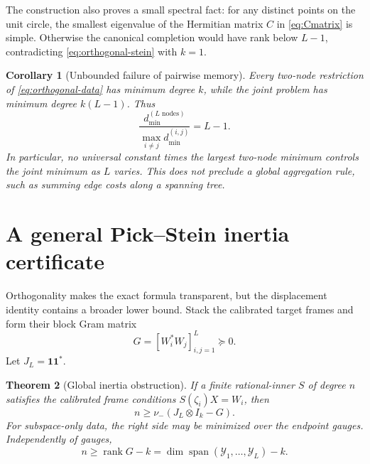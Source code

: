 \documentclass[11pt]{article}
\newtheorem{theorem}{Theorem}[section]
\newtheorem{corollary}[theorem]{Corollary}
\theoremstyle{definition}
\theoremstyle{remark}
\newcommand{\rank}{\operatorname{rank}}
\newcommand{\Span}{\operatorname{span}}
\newcommand{\nminus}{\nu_{-}}
\begin{document}
The construction also proves a small spectral fact: for any distinct points
on the unit circle, the smallest eigenvalue of the Hermitian matrix $C$ in
\eqref{eq:Cmatrix} is simple.  Otherwise the canonical completion would have
rank below $L-1$, contradicting \eqref{eq:orthogonal-stein} with $k=1$.

\begin{corollary}[Unbounded failure of pairwise memory]
\label{cor:pairwise-gap}
Every two-node restriction of \eqref{eq:orthogonal-data} has minimum degree
$k$, while the joint problem has minimum degree $k(L-1)$.  Thus
\begin{equation}\label{eq:gap-ratio}
 \frac{d_{\min}^{(L\text{ nodes})}}
      {\max_{i\ne j}d_{\min}^{(i,j)}}=L-1.
\end{equation}
In particular, no universal constant times the largest two-node minimum
controls the joint minimum as $L$ varies.  This does not preclude a global
aggregation rule, such as summing edge costs along a spanning tree.
\end{corollary}

\section{A general Pick--Stein inertia certificate}

Orthogonality makes the exact formula transparent, but the displacement
identity contains a broader lower bound.  Stack the calibrated target frames
and form their block Gram matrix
\begin{equation}\label{eq:target-gram}
             G=[W_i^*W_j]_{i,j=1}^L\succeq0.
\end{equation}
Let $J_L=\mathbf1\mathbf1^*$.

\begin{theorem}[Global inertia obstruction]
\label{thm:inertia}
If a finite rational-inner $S$ of degree $n$ satisfies the calibrated frame
conditions $S(\zeta_i)X=W_i$, then
\begin{equation}\label{eq:inertia-bound}
                  \boxed{\quad n\ge\nminus(J_L\otimes I_k-G).\quad}
\end{equation}
For subspace-only data, the right side may be minimized over the endpoint
gauges.  Independently of gauges,
\begin{equation}\label{eq:span-bound}
 n\ge\rank G-k
  =\dim\Span(\mathcal Y_1,\ldots,\mathcal Y_L)-k.
\end{equation}
\end{theorem}
\end{document}
